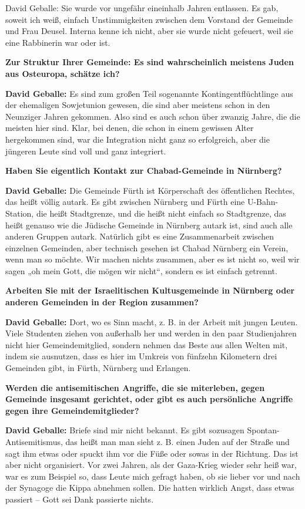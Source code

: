 David Geballe: Sie wurde vor ungefähr eineinhalb Jahren entlassen. Es gab, soweit ich weiß, einfach Unstimmigkeiten zwischen dem Vorstand der Gemeinde und Frau Deusel. Interna kenne ich nicht, aber sie wurde nicht gefeuert, weil sie eine Rabbinerin war oder ist. 

\textbf{Zur Struktur Ihrer Gemeinde: Es sind wahrscheinlich meistens Juden aus Osteuropa, schätze ich?}

\textbf{David Geballe:} Es sind zum großen Teil sogenannte Kontingentflüchtlinge aus der ehemaligen Sowjetunion gewesen, die sind aber meistens schon in den Neunziger Jahren gekommen. Also sind es auch schon über zwanzig Jahre, die die meisten hier sind. Klar, bei denen, die schon in einem gewissen Alter hergekommen sind, war die Integration nicht ganz so erfolgreich, aber die jüngeren Leute sind voll und ganz integriert. 

\textbf{Haben Sie eigentlich Kontakt zur Chabad-Gemeinde in Nürnberg?}

\textbf{David Geballe:} Die Gemeinde Fürth ist Körperschaft des öffentlichen Rechtes, das heißt völlig autark. Es gibt zwischen Nürnberg und Fürth eine U-Bahn-Station, die heißt Stadtgrenze, und die heißt nicht einfach so Stadtgrenze, das heißt genauso wie die Jüdische Gemeinde in Nürnberg autark ist, sind auch alle anderen Gruppen autark. Natürlich gibt es eine Zusammenarbeit zwischen einzelnen Gemeinden, aber technisch gesehen ist Chabad Nürnberg ein Verein, wenn man so möchte. Wir machen nichts zusammen, aber es ist nicht so, weil wir sagen „oh mein Gott, die mögen wir nicht“, sondern es ist einfach getrennt. 

\textbf{Arbeiten Sie mit der Israelitischen Kultusgemeinde in Nürnberg oder anderen Gemeinden in der Region zusammen?} 

\textbf{David Geballe:} Dort, wo es Sinn macht, z. B. in der Arbeit mit jungen Leuten. Viele Studenten ziehen von außerhalb her und werden in den paar Studienjahren nicht hier Gemeindemitglied, sondern nehmen das Beste aus allen Welten mit, indem sie ausnutzen, dass es hier im Umkreis von fünfzehn Kilometern drei Gemeinden gibt, in Fürth, Nürnberg und Erlangen. 

\textbf{Werden die antisemitischen Angriffe, die sie miterleben, gegen Gemeinde insgesamt gerichtet, oder gibt es auch persönliche Angriffe gegen ihre Gemeindemitglieder?} 

\textbf{David Geballe:} Briefe sind mir nicht bekannt. Es gibt sozusagen Spontan-Antisemitismus, das heißt man man sieht z. B. einen Juden auf der Straße und sagt ihm etwas oder spuckt ihm vor die Füße oder sowas in der Richtung. Das ist aber nicht organisiert. Vor zwei Jahren, als der Gaza-Krieg wieder sehr heiß war, war es zum Beispiel so, dass Leute mich gefragt haben, ob sie lieber vor und nach der Synagoge die Kippa abnehmen sollen. Die hatten wirklich Angst, dass etwas passiert – Gott sei Dank passierte nichts. 

